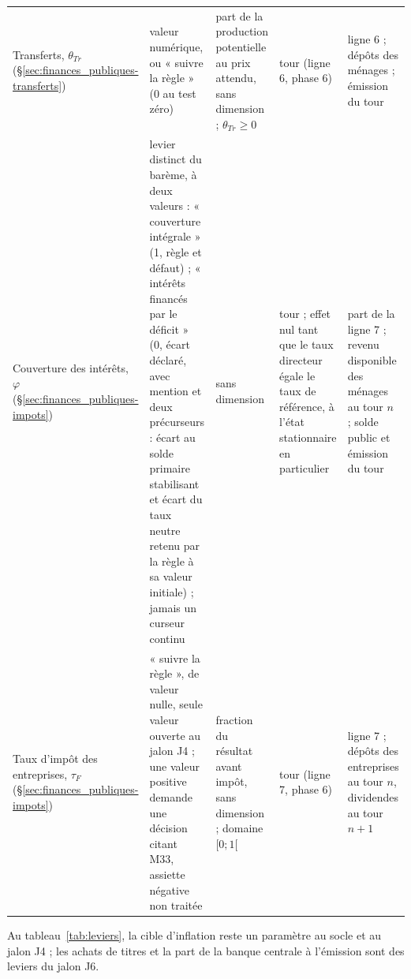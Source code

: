 \documentclass[11pt,a4paper]{article}
\begin{document}
\begin{center}
\begin{longtable}{>{\raggedright\arraybackslash}p{3.2cm}>{\raggedright\arraybackslash}p{2.2cm}>{\raggedright\arraybackslash}p{2.2cm}>{\raggedright\arraybackslash}p{2.2cm}>{\raggedright\arraybackslash}p{4.3cm}}
Transferts, $\theta_{\mathit{Tr}}$ (\S\ref{sec:finances_publiques-transferts}) & valeur numérique, ou « suivre la règle » (0 au test zéro) & part de la production potentielle au prix attendu, sans dimension ; $\theta_{\mathit{Tr}} \ge 0$ & 0 tour (ligne 6, phase 6) & ligne 6 ; dépôts des ménages ; émission du tour\\
Couverture des intérêts, $\varphi$ (\S\ref{sec:finances_publiques-impots}) & levier distinct du barème, à deux valeurs : « couverture intégrale » (1, règle et défaut) ; « intérêts financés par le déficit » (0, écart déclaré, avec mention et deux précurseurs : écart au solde primaire stabilisant et écart du taux neutre retenu par la règle à sa valeur initiale) ; jamais un curseur continu & sans dimension & 0 tour ; effet nul tant que le taux directeur égale le taux de référence, à l'état stationnaire en particulier & part de la ligne 7 ; revenu disponible des ménages au tour $n$ ; solde public et émission du tour\\
Taux d'impôt des entreprises, $\tau_F$ (\S\ref{sec:finances_publiques-impots}) & « suivre la règle », de valeur nulle, seule valeur ouverte au jalon J4 ; une valeur positive demande une décision citant M33, assiette négative non traitée & fraction du résultat avant impôt, sans dimension ; domaine $[0 ; 1[$ & 0 tour (ligne 7, phase 6) & ligne 7 ; dépôts des entreprises au tour $n$, dividendes au tour $n + 1$\\
\bottomrule
\end{longtable}
\end{center}
Au tableau~\ref{tab:leviers}, la cible d'inflation reste un paramètre au socle et au jalon J4 ; les achats de titres et la part de la banque centrale à l'émission sont des leviers du jalon J6.

\end{document}

